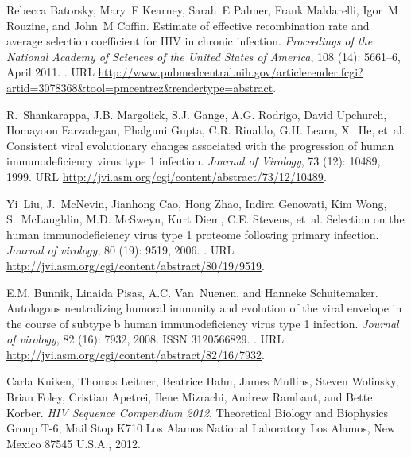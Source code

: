 \documentclass[11pt]{article}
\begin{document}
\begin{thebibliography}{48}
Rebecca Batorsky, Mary~F Kearney, Sarah~E Palmer, Frank Maldarelli, Igor~M
  Rouzine, and John~M Coffin.
\newblock Estimate of effective recombination rate and average selection
  coefficient for {HIV} in chronic infection.
\newblock \emph{Proceedings of the National Academy of Sciences of the United
  States of America}, 108 (14): 5661--6, April 2011.
\newblock {}.
\newblock URL
  \url{http://www.pubmedcentral.nih.gov/articlerender.fcgi?artid=3078368&tool=pmcentrez&rendertype=abstract}.

R.~Shankarappa, {J.B.} Margolick, {S.J.} Gange, {A.G.} Rodrigo, David Upchurch,
  Homayoon Farzadegan, Phalguni Gupta, {C.R.} Rinaldo, {G.H.} Learn, X.~He,
  et~al.
\newblock Consistent viral evolutionary changes associated with the progression
  of human immunodeficiency virus type 1 infection.
\newblock \emph{Journal of Virology}, 73 (12): 10489, 1999.
\newblock URL \url{http://jvi.asm.org/cgi/content/abstract/73/12/10489}.

Yi~Liu, J.~{McNevin}, Jianhong Cao, Hong Zhao, Indira Genowati, Kim Wong,
  S.~{McLaughlin}, {M.D.} {McSweyn}, Kurt Diem, {C.E.} Stevens, et~al.
\newblock Selection on the human immunodeficiency virus type 1 proteome
  following primary infection.
\newblock \emph{Journal of virology}, 80 (19): 9519, 2006.
\newblock {}.
\newblock URL \url{http://jvi.asm.org/cgi/content/abstract/80/19/9519}.

{E.M.} Bunnik, Linaida Pisas, {A.C.} Van~Nuenen, and Hanneke Schuitemaker.
\newblock Autologous neutralizing humoral immunity and evolution of the viral
  envelope in the course of subtype b human immunodeficiency virus type 1
  infection.
\newblock \emph{Journal of virology}, 82 (16): 7932, 2008.
\newblock ISSN 3120566829.
\newblock {}.
\newblock URL \url{http://jvi.asm.org/cgi/content/abstract/82/16/7932}.

Carla Kuiken, Thomas Leitner, Beatrice Hahn, James Mullins, Steven Wolinsky,
  Brian Foley, Cristian Apetrei, Ilene Mizrachi, Andrew Rambaut, and Bette
  Korber.
\newblock \emph{HIV Sequence Compendium 2012}.
\newblock Theoretical Biology and Biophysics Group T-6, Mail Stop K710 Los
  Alamos National Laboratory Los Alamos, New Mexico 87545 U.S.A., 2012.


\end{thebibliography}
\end{document}
